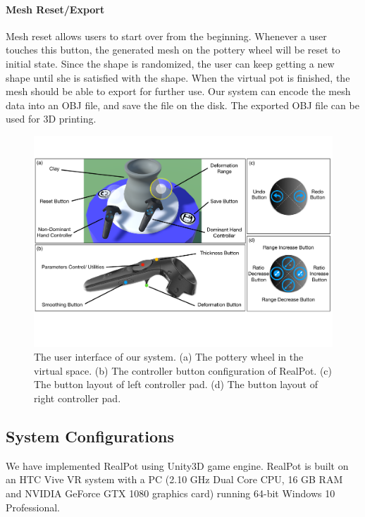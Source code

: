\documentclass{svjour3}                     %
\begin{document}
\paragraph{Mesh Reset/Export}
Mesh reset allows users to start over from the beginning.
Whenever a user touches this button, the generated mesh on the pottery wheel will be reset to initial state. Since the shape is randomized, the user can keep getting a new shape until she is satisfied with the shape.
When the virtual pot is finished, the mesh should be able to export for further use. Our system can encode the mesh data into an OBJ file, and save the file on the disk. The exported OBJ file can be used for 3D printing.


\begin{figure}
\includegraphics[width=\textwidth]{fig9}
\caption{The user interface of our system. (a) The pottery wheel in the virtual space. (b) The controller button configuration of RealPot. (c) The button layout of left controller pad. (d) The button layout of right controller pad.}
\label{fig:ui}
\end{figure}


\subsection{System Configurations}
\label{sec:config}

We have implemented RealPot using Unity3D \cite{website:unity} game engine. RealPot is built on an HTC Vive VR system with a PC (2.10 GHz Dual Core CPU, 16 GB RAM and NVIDIA GeForce GTX 1080 graphics card) running 64-bit Windows 10 Professional.
\end{document}
